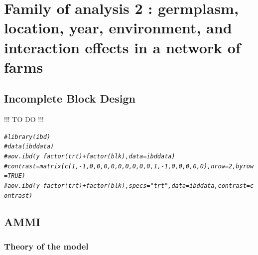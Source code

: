 \documentclass{book}\usepackage[]{graphicx}\usepackage[]{color}
\makeatletter
\newcommand{\hlcom}[1]{\textcolor[rgb]{0.678,0.584,0.686}{\textit{#1}}}%
\newenvironment{kframe}{%
 \def\at@end@of@kframe{}%
 \ifinner\ifhmode%
  \def\at@end@of@kframe{\end{minipage}}%
  \begin{minipage}{\columnwidth}%
 \fi\fi%
 \def\FrameCommand##1{\hskip\@totalleftmargin \hskip-\fboxsep
 \colorbox{shadecolor}{##1}\hskip-\fboxsep
     \hskip-\linewidth \hskip-\@totalleftmargin \hskip\columnwidth}%
 \MakeFramed {\advance\hsize-\width
   \@totalleftmargin\z@ \linewidth\hsize
   \@setminipage}}%
 {\par\unskip\endMakeFramed%
 \at@end@of@kframe}
\newenvironment{knitrout}{}{} %
\makeatother
\begin{document}
\newpage

\section{Family of analysis 2 : germplasm, location, year, environment, and interaction effects in a network of farms}


\subsection{Incomplete Block Design}
\label{ibd}

!!! TO DO !!!

\begin{knitrout}
\color{fgcolor}\begin{kframe}
\begin{alltt}
\hlcom{#library(ibd)}
\hlcom{#data(ibddata)}
\hlcom{#aov.ibd(y~factor(trt)+factor(blk),data=ibddata)}
\hlcom{#contrast=matrix(c(1,-1,0,0,0,0,0,0,0,0,0,1,-1,0,0,0,0,0),nrow=2,byrow=TRUE)}
\hlcom{#aov.ibd(y~factor(trt)+factor(blk),specs="trt",data=ibddata,contrast=contrast)}
\end{alltt}
\end{kframe}
\end{knitrout}


\subsection{AMMI}
\label{ammi}

\subsubsection{Theory of the model}
\end{document}
